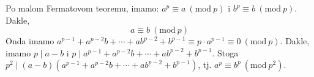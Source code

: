 \documentclass{exam}
\newcommand{\Mod}[1]{\ (\mathrm{mod}\ #1)}
\begin{document}
\begin{questions}
\begin{solution}
  Po malom Fermatovom teoremu, imamo: $a^p \equiv a \Mod{p}$ i $b^p \equiv b \Mod{p}$. Dakle,
  \[
    a \equiv b \Mod{p}
  \]
  Onda imamo $a^{p-1} + a^{p-2}b + \cdots + ab^{p-2} + b^{p-1} \equiv p \cdot a^{p-1} \equiv 0 \Mod{p}$. Dakle, imamo $p \mid a - b$ i $p \mid a^{p-1} + a^{p-2}b + \cdots + ab^{p-2} + b^{p-1}$. Stoga $p^2 \mid (a-b)(a^{p-1} + a^{p-2}b + \cdots + ab^{p-2} + b^{p-1})$, tj. $a^p \equiv b^p \Mod{p^2}$.
\end{solution}

\end{questions}
\end{document}
